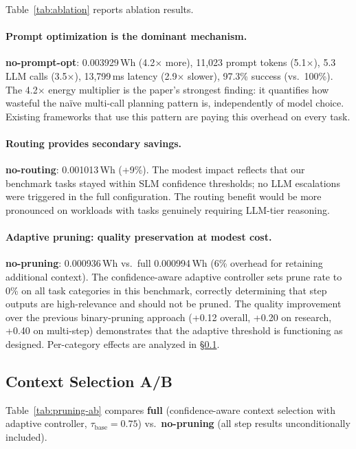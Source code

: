 \documentclass[sigconf,authordraft]{acmart}
\begin{document}
Table~\ref{tab:ablation} reports ablation results.

\paragraph{Prompt optimization is the dominant mechanism.}
\textbf{no-prompt-opt}: 0.003929\,Wh (4.2$\times$ more), 11,023 prompt tokens (5.1$\times$), 5.3 LLM calls (3.5$\times$), 13,799\,ms latency (2.9$\times$ slower), 97.3\% success (vs.\ 100\%).
The 4.2$\times$ energy multiplier is the paper's strongest finding: it quantifies how wasteful the na\"{i}ve multi-call planning pattern is, independently of model choice.
Existing frameworks that use this pattern are paying this overhead on every task.

\paragraph{Routing provides secondary savings.}
\textbf{no-routing}: 0.001013\,Wh (+9\%).
The modest impact reflects that our benchmark tasks stayed within SLM confidence thresholds; no LLM escalations were triggered in the full configuration.
The routing benefit would be more pronounced on workloads with tasks genuinely requiring LLM-tier reasoning.

\paragraph{Adaptive pruning: quality preservation at modest cost.}
\textbf{no-pruning}: 0.000936\,Wh vs.\ full 0.000994\,Wh (6\% overhead for retaining additional context).
The confidence-aware adaptive controller sets prune rate to 0\% on all task categories in this benchmark, correctly determining that step outputs are high-relevance and should not be pruned.
The quality improvement over the previous binary-pruning approach (+0.12 overall, +0.20 on research, +0.40 on multi-step) demonstrates that the adaptive threshold is functioning as designed.
Per-category effects are analyzed in \S\ref{sec:pruning-ab}.

\subsection{Context Selection A/B}
\label{sec:pruning-ab}

Table~\ref{tab:pruning-ab} compares \textbf{full} (confidence-aware context selection with adaptive controller, $\tau_{\text{base}}=0.75$) vs.\ \textbf{no-pruning} (all step results unconditionally included).
\end{document}

